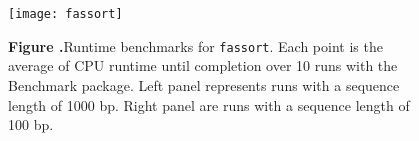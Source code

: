 \documentclass{frontiersSCNS} %
\begin{document}
\begin{figure}
\begin{center}
\texttt{[image: fassort]}%
\end{center}
\textbf{\label{fig:02} Figure
  .}{Runtime benchmarks for {\tt fassort}. Each point
  is the average of CPU runtime until completion over 10 runs with the
  Benchmark package. Left panel represents runs with a sequence length
  of 1000 bp. Right panel are runs with a sequence length of 100 bp.}
\end{figure}
\end{document}
